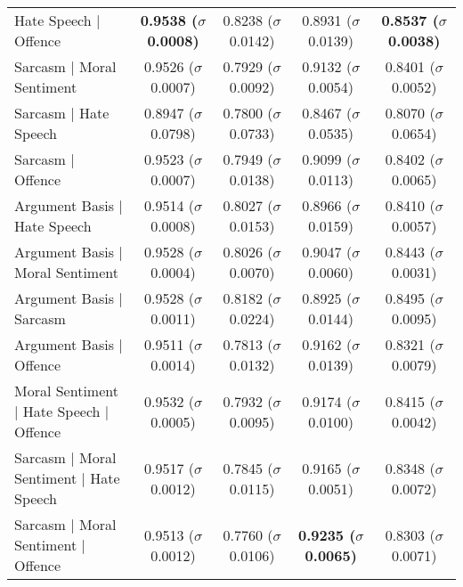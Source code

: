 {\begin{landscape}
\begin{table}[]
{\begin{tabular}{l|cccc}
    Hate Speech | Offence                                               & \textbf{0.9538 ($\sigma$ 0.0008)} & 0.8238 ($\sigma$ 0.0142)          & 0.8931 ($\sigma$ 0.0139)          & \textbf{0.8537 ($\sigma$ 0.0038)} \\
    Sarcasm | Moral Sentiment                                           & 0.9526 ($\sigma$ 0.0007)          & 0.7929 ($\sigma$ 0.0092)          & 0.9132 ($\sigma$ 0.0054)          & 0.8401 ($\sigma$ 0.0052)          \\
    Sarcasm | Hate Speech                                               & 0.8947 ($\sigma$ 0.0798)          & 0.7800 ($\sigma$ 0.0733)          & 0.8467 ($\sigma$ 0.0535)          & 0.8070 ($\sigma$ 0.0654)          \\
    Sarcasm | Offence                                                   & 0.9523 ($\sigma$ 0.0007)          & 0.7949 ($\sigma$ 0.0138)          & 0.9099 ($\sigma$ 0.0113)          & 0.8402 ($\sigma$ 0.0065)          \\
    Argument Basis | Hate Speech                                        & 0.9514 ($\sigma$ 0.0008)          & 0.8027 ($\sigma$ 0.0153)          & 0.8966 ($\sigma$ 0.0159)          & 0.8410 ($\sigma$ 0.0057)          \\
    Argument Basis | Moral Sentiment                                    & 0.9528 ($\sigma$ 0.0004)          & 0.8026 ($\sigma$ 0.0070)          & 0.9047 ($\sigma$ 0.0060)          & 0.8443 ($\sigma$ 0.0031)          \\
    Argument Basis | Sarcasm                                            & 0.9528 ($\sigma$ 0.0011)          & 0.8182 ($\sigma$ 0.0224)          & 0.8925 ($\sigma$ 0.0144)          & 0.8495 ($\sigma$ 0.0095)          \\
    Argument Basis | Offence                                            & 0.9511 ($\sigma$ 0.0014)          & 0.7813 ($\sigma$ 0.0132)          & 0.9162 ($\sigma$ 0.0139)          & 0.8321 ($\sigma$ 0.0079)          \\
    Moral Sentiment | Hate Speech | Offence                             & 0.9532 ($\sigma$ 0.0005)          & 0.7932 ($\sigma$ 0.0095)          & 0.9174 ($\sigma$ 0.0100)          & 0.8415 ($\sigma$ 0.0042)          \\
    Sarcasm | Moral Sentiment | Hate Speech                             & 0.9517 ($\sigma$ 0.0012)          & 0.7845 ($\sigma$ 0.0115)          & 0.9165 ($\sigma$ 0.0051)          & 0.8348 ($\sigma$ 0.0072)          \\
    Sarcasm | Moral Sentiment | Offence                                 & 0.9513 ($\sigma$ 0.0012)          & 0.7760 ($\sigma$ 0.0106)          & \textbf{0.9235 ($\sigma$ 0.0065)} & 0.8303 ($\sigma$ 0.0071)          \\

\end{tabular}}
\end{table}
\end{landscape}}
